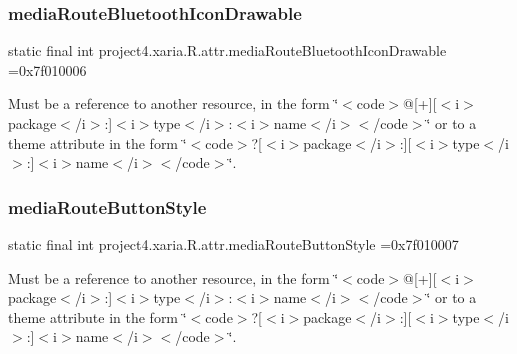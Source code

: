 \subsubsection{\texorpdfstring{media\+Route\+Bluetooth\+Icon\+Drawable}{mediaRouteBluetoothIconDrawable}}
{\footnotesize\ttfamily static final int project4.\+xaria.\+R.\+attr.\+media\+Route\+Bluetooth\+Icon\+Drawable =0x7f010006\hspace{0.3cm}{\ttfamily [static]}}

Must be a reference to another resource, in the form \char`\"{}$<$code$>$@\mbox{[}+\mbox{]}\mbox{[}$<$i$>$package$<$/i$>$\+:\mbox{]}$<$i$>$type$<$/i$>$\+:$<$i$>$name$<$/i$>$$<$/code$>$\char`\"{} or to a theme attribute in the form \char`\"{}$<$code$>$?\mbox{[}$<$i$>$package$<$/i$>$\+:\mbox{]}\mbox{[}$<$i$>$type$<$/i$>$\+:\mbox{]}$<$i$>$name$<$/i$>$$<$/code$>$\char`\"{}. \mbox{\label{classproject4_1_1xaria_1_1R_1_1attr_af6698191c0de933a1292ed46beeff80f}} 
\subsubsection{\texorpdfstring{media\+Route\+Button\+Style}{mediaRouteButtonStyle}}
{\footnotesize\ttfamily static final int project4.\+xaria.\+R.\+attr.\+media\+Route\+Button\+Style =0x7f010007\hspace{0.3cm}{\ttfamily [static]}}

Must be a reference to another resource, in the form \char`\"{}$<$code$>$@\mbox{[}+\mbox{]}\mbox{[}$<$i$>$package$<$/i$>$\+:\mbox{]}$<$i$>$type$<$/i$>$\+:$<$i$>$name$<$/i$>$$<$/code$>$\char`\"{} or to a theme attribute in the form \char`\"{}$<$code$>$?\mbox{[}$<$i$>$package$<$/i$>$\+:\mbox{]}\mbox{[}$<$i$>$type$<$/i$>$\+:\mbox{]}$<$i$>$name$<$/i$>$$<$/code$>$\char`\"{}. \mbox{\label{classproject4_1_1xaria_1_1R_1_1attr_a6da0a32cd526b2860fa1958cbf1ba5bf}} 
